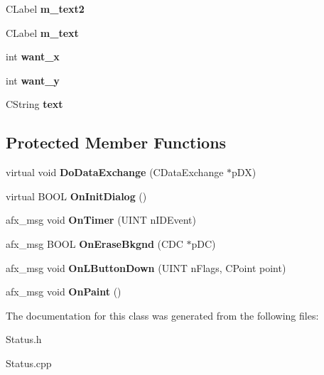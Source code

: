 \begin{DoxyCompactItemize}
\item 
\hypertarget{class_c_status_ae2d727c00e6dafee0ad8ee049047d508}{C\-Label {\bfseries m\-\_\-text2}}\label{class_c_status_ae2d727c00e6dafee0ad8ee049047d508}

\item 
\hypertarget{class_c_status_ae3bfd7f5b1159477e3080ce368787847}{C\-Label {\bfseries m\-\_\-text}}\label{class_c_status_ae3bfd7f5b1159477e3080ce368787847}

\item 
\hypertarget{class_c_status_a07530bfd39768bf84b3e7f9b8d4e8b90}{int {\bfseries want\-\_\-x}}\label{class_c_status_a07530bfd39768bf84b3e7f9b8d4e8b90}

\item 
\hypertarget{class_c_status_a33600c05212f3ad3a757409214959d9d}{int {\bfseries want\-\_\-y}}\label{class_c_status_a33600c05212f3ad3a757409214959d9d}

\item 
\hypertarget{class_c_status_a36e3a835ffb64c6202e5937b6ca2f783}{C\-String {\bfseries text}}\label{class_c_status_a36e3a835ffb64c6202e5937b6ca2f783}

\end{DoxyCompactItemize}
\subsection*{Protected Member Functions}
\begin{DoxyCompactItemize}
\item 
\hypertarget{class_c_status_aa853cace942a2829ac1a4d4def0ec3cb}{virtual void {\bfseries Do\-Data\-Exchange} (C\-Data\-Exchange $\ast$p\-D\-X)}\label{class_c_status_aa853cace942a2829ac1a4d4def0ec3cb}

\item 
\hypertarget{class_c_status_ac2ba1aba37514037ce24c09a48f764c4}{virtual B\-O\-O\-L {\bfseries On\-Init\-Dialog} ()}\label{class_c_status_ac2ba1aba37514037ce24c09a48f764c4}

\item 
\hypertarget{class_c_status_af0e9298abebb90ce66229c14cc031fea}{afx\-\_\-msg void {\bfseries On\-Timer} (U\-I\-N\-T n\-I\-D\-Event)}\label{class_c_status_af0e9298abebb90ce66229c14cc031fea}

\item 
\hypertarget{class_c_status_ae4dd70f7f479c5f78c1620bfaa0ad07f}{afx\-\_\-msg B\-O\-O\-L {\bfseries On\-Erase\-Bkgnd} (C\-D\-C $\ast$p\-D\-C)}\label{class_c_status_ae4dd70f7f479c5f78c1620bfaa0ad07f}

\item 
\hypertarget{class_c_status_a09c56c7ab2b9f63204e485dbd5c2a3ca}{afx\-\_\-msg void {\bfseries On\-L\-Button\-Down} (U\-I\-N\-T n\-Flags, C\-Point point)}\label{class_c_status_a09c56c7ab2b9f63204e485dbd5c2a3ca}

\item 
\hypertarget{class_c_status_a164e1e7d9d16ff0f74bd154bcce1b898}{afx\-\_\-msg void {\bfseries On\-Paint} ()}\label{class_c_status_a164e1e7d9d16ff0f74bd154bcce1b898}

\end{DoxyCompactItemize}


The documentation for this class was generated from the following files\-:\begin{DoxyCompactItemize}
\item 
Status.\-h\item 
Status.\-cpp\end{DoxyCompactItemize}
